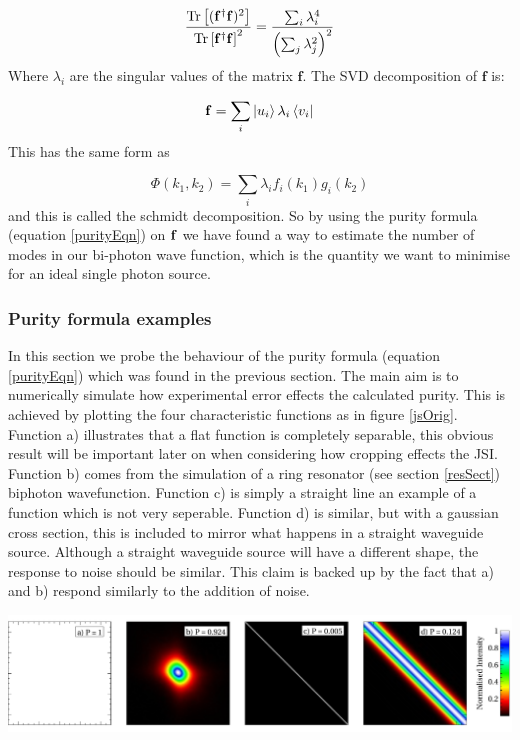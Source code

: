 \begin{align}
\frac{\operatorname{Tr}\left [({\bf f}^{\dagger}{\bf f})^2 \right ]}{\operatorname{Tr}\left [{\bf f}^{\dagger}{\bf f} \right ]^2}=\frac{\sum_{i}\lambda^4_i}{\left ( \sum_{j}\lambda^2_j \right )^2}
\end{align}
\noindent
Where $\lambda_i$ are the singular values of the matrix $\mathbf{f}$. The SVD decomposition of $\mathbf{f}$ is:

\begin{equation}
 {\bf f} = \sum_i \ket{u_i} \lambda_i \bra{v_i}
\end{equation}
\noindent
This has the same form as

\begin{equation} \label{modes}
	\Phi(k_1,k_2) = \sum_i \lambda_if_i(k_1)g_i(k_2)
\end{equation}
\noindent
and this is called the schmidt decomposition. So by using the purity formula (equation \ref{purityEqn}) on ${\bf f }$ we have found a way to estimate the number of modes in our bi-photon wave function, which is the quantity we want to minimise for an ideal single photon source.

\subsubsection{Purity formula examples}

In this section we probe the behaviour of the purity formula (equation \ref{purityEqn}) which was found in the previous section. The main aim is to numerically simulate how experimental error effects the calculated purity. This is achieved by plotting the four characteristic functions as in figure \ref{jsOrig}. Function a) illustrates that a flat function is completely separable, this obvious result will be important later on when considering how cropping effects the JSI. Function b) comes from the simulation of a ring resonator (see section \ref{resSect}) biphoton wavefunction. Function c) is simply a straight line an example of a function which is not very seperable. Function d) is similar, but with a gaussian cross section, this is included to mirror what happens in a straight waveguide source. Although a straight waveguide source will have a different shape, the response to noise should be similar. This claim is backed up by the fact that a) and b) respond similarly to the addition of noise.

\begingroup
\centering
    \includegraphics[width=17cm]{res/theory/js_original.pdf}
\label{jsOrig}
\endgroup


